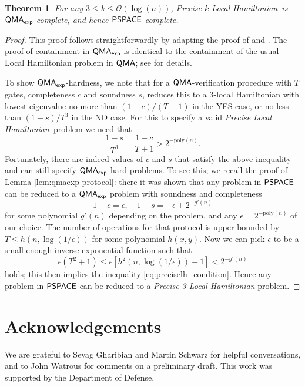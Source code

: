 \documentclass[11pt]{article}
\newtheorem{theorem}{Theorem}
\theoremstyle{definition}
\theoremstyle{remark}
\newcommand\QMA{{\sf{QMA}}}
\newcommand\PSPACE{{\sf{PSPACE}}}
\newcommand\QMAexp{{\sf{QMA}_{exp}}}
\newcommand\preciselh{\textit{Precise Local Hamiltonian}}
\newcommand\preciseklh{\textit{Precise }$k$-\textit{Local Hamiltonian}}
\newcommand\preciseilh[1]{\textit{Precise #1-Local Hamiltonian}}
\newcommand{\poly}{\mathrm{poly}}
\begin{document}
\begingroup
\def\thetheorem{\ref{thm:lh}}
\begin{theorem}
For any $3 \le k \le \mathcal{O}(\log(n))$, \preciseklh \ is $\QMAexp$-complete, and hence $\PSPACE$-complete.
\end{theorem}
\addtocounter{theorem}{-1}
\endgroup

\begin{proof}
This proof follows straightforwardly by adapting the proof of \cite{ksv02} and \cite{kr03}. The proof of containment in $\QMAexp$ is identical to the containment of the usual Local Hamiltonian problem in $\QMA$; see \cite{ksv02} for details.

To show $\QMAexp$-hardness, we note that for a $\QMA$-verification procedure with $T$ gates, completeness $c$ and soundness $s$, \cite{kr03} reduces this to a 3-local Hamiltonian with lowest eigenvalue no more than $(1-c) / (T+1)$ in the YES case, or no less than $(1-s) / T^3$ in the NO case. For this to specify a valid \preciselh \ problem we need that
\begin{equation} \label{eq:preciselh_condition}
\frac{1-s}{T^3} - \frac{1-c}{T+1} > 2^{-\poly(n)}.
\end{equation}
Fortunately, there are indeed values of $c$ and $s$ that satisfy the above inequality and can still specify $\QMAexp$-hard problems. To see this, we recall the proof of Lemma \ref{lem:qmaexp protocol}: there it was shown that any problem in $\PSPACE$ can be reduced to a $\QMAexp$ problem with soundness and completeness
\begin{equation}
1-c = \epsilon,\quad 1 - s = -\epsilon + 2^{-g'(n)}
\end{equation}
for some polynomial $g'(n)$ depending on the problem, and any $\epsilon = 2^{-\poly(n)}$ of our choice. The number of operations for that protocol is upper bounded by $T \le h(n,\log (1/\epsilon))$ for some polynomial $h(x,y)$. Now we can pick $\epsilon$ to be a small enough inverse exponential function such that
\begin{equation}
\epsilon (T^2+1) \le \epsilon [h^2(n,\log(1/\epsilon)) +1] < 2^{-g'(n)} 
\end{equation}
holds; this then implies the inequality \ref{eq:preciselh_condition}. Hence any problem in $\PSPACE$ can be reduced to a \preciseilh{3} problem.
\end{proof}
\section{Acknowledgements}
We are grateful to Sevag Gharibian and Martin Schwarz for helpful conversations, and to John Watrous for comments on a preliminary draft. This work was supported by the Department of Defense.


\end{document}
